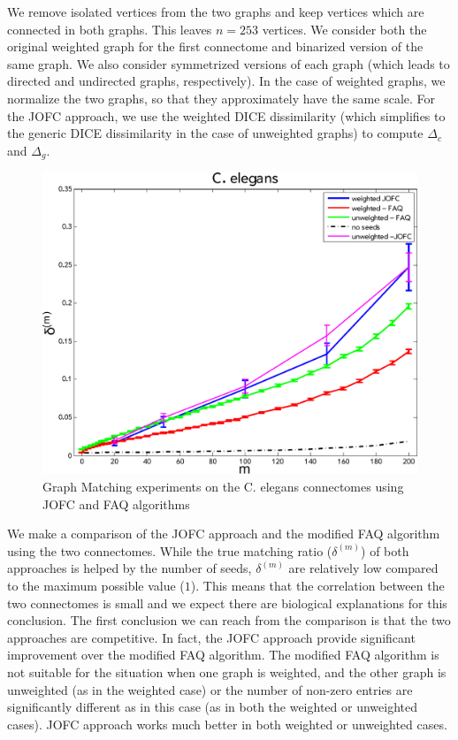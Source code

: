 \documentclass[12pt,oneside,final]{thesis}\usepackage[]{graphicx}\usepackage[]{color}
\begin{document}
We remove isolated vertices from the two graphs and keep vertices which are connected in both graphs. This leaves $n=253$  vertices. We consider both the original weighted graph for the first connectome and binarized version of the same graph. We  also consider symmetrized versions of each graph (which leads to directed and undirected graphs, respectively). In the case of weighted graphs, we normalize the two graphs, so that they approximately have the same scale. For the JOFC approach, we use the weighted DICE dissimilarity (which simplifies to the generic DICE dissimilarity in the case of unweighted graphs) to compute $\Delta_c$ and $\Delta_g$.   

\begin{figure}
\includegraphics[scale=0.75]{worm_jofc_vs_faq_wt_unwt-crop}
\caption{Graph Matching experiments on the C. elegans connectomes using JOFC and FAQ algorithms \label{worm_graphmatch}}
\end{figure}

We make  a comparison of the JOFC approach and the modified FAQ algorithm using the two connectomes. While the true matching ratio ($\delta^{(m)}$) of both approaches is helped by the number of seeds,  $\delta^{(m)}$ are relatively low compared to the maximum possible value ($1$). This means that the correlation between the two connectomes is small and we expect there are biological explanations for this conclusion.  
The first conclusion we can reach from the comparison is that the two approaches are competitive. In fact, the JOFC approach provide significant improvement over the modified FAQ algorithm. The modified FAQ algorithm is not suitable for the situation when one graph is weighted, and the other graph is unweighted (as in the weighted case) or the number of non-zero entries are significantly different as in this case (as in both the weighted or unweighted cases). JOFC approach works much better in both weighted or unweighted cases. 
\end{document}
